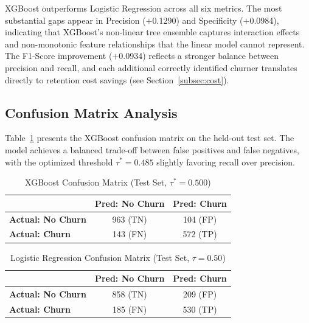 \documentclass[10pt, conference, letterpaper]{IEEEtran}
\begin{document}
XGBoost outperforms Logistic Regression across all six metrics. The most substantial gaps appear in Precision ($+$0.1290) and Specificity ($+$0.0984), indicating that XGBoost's non-linear tree ensemble captures interaction effects and non-monotonic feature relationships that the linear model cannot represent. The F1-Score improvement ($+$0.0934) reflects a stronger balance between precision and recall, and each additional correctly identified churner translates directly to retention cost savings (see Section~\ref{subsec:cost}).

\subsection{Confusion Matrix Analysis}

Table~\ref{tab:cm_xgb} presents the XGBoost confusion matrix on the held-out test set. The model achieves a balanced trade-off between false positives and false negatives, with the optimized threshold $\tau^*{=}0.485$ slightly favoring recall over precision.

\begin{table}[htbp]
\caption{XGBoost Confusion Matrix (Test Set, $\tau^*{=}0.500$)}
\label{tab:cm_xgb}
\begin{center}
\begin{tabular}{@{}lcc@{}}
\toprule
 & \textbf{Pred: No Churn} & \textbf{Pred: Churn} \\
\midrule
\textbf{Actual: No Churn} & 963 (TN) & 104 (FP) \\
\textbf{Actual: Churn}    & 143 (FN) & 572 (TP) \\
\bottomrule
\end{tabular}
\end{center}
\end{table}

\begin{table}[htbp]
\caption{Logistic Regression Confusion Matrix (Test Set, $\tau{=}0.50$)}
\label{tab:cm_lr}
\begin{center}
\begin{tabular}{@{}lcc@{}}
\toprule
 & \textbf{Pred: No Churn} & \textbf{Pred: Churn} \\
\midrule
\textbf{Actual: No Churn} & 858 (TN) & 209 (FP) \\
\textbf{Actual: Churn}    & 185 (FN) & 530 (TP) \\
\bottomrule
\end{tabular}
\end{center}
\end{table}
\end{document}
